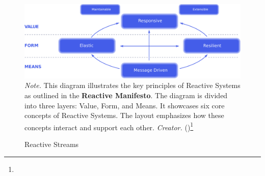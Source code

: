 \begin{figure}[H]
\caption{Reactive Streams}
\centering
\includegraphics[width=1\linewidth]{images/reactive-traits.pdf}
\small
\textit{Note.} This diagram illustrates the key principles of Reactive Systems as outlined in the \textbf{Reactive Manifesto}. The diagram is divided into three layers: Value, Form, and Means. It showcases six core concepts of Reactive Systems. The layout emphasizes how these concepts interact and support each other.
\textit{Creator.} (\cite{stream})\footnote[34]{}
\end{figure}
